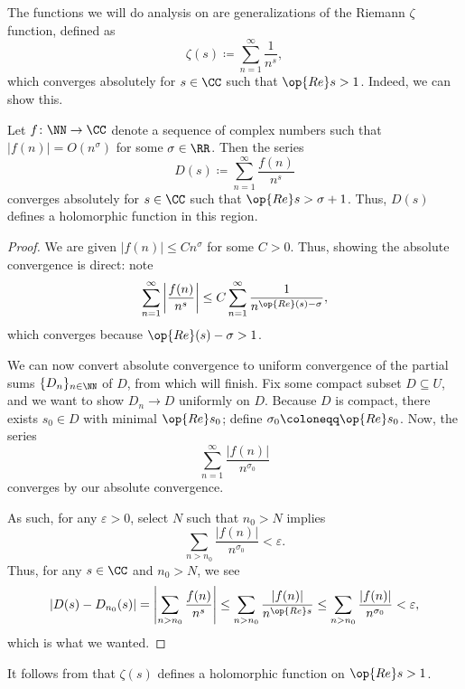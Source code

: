 \documentclass[../notes.tex]{subfiles}
\begin{document}
The functions we will do analysis on are generalizations of the Riemann $\zeta$ function, defined as
\[\zeta(s)\coloneqq\sum_{n=1}^\infty\frac1{n^s},\]
which converges absolutely for $s\in\CC$ such that $\op{Re}s>1$. Indeed, we can show this.
\begin{proposition} \label{prop:basic-dirichlet-series}
	Let $f\colon\NN\to\CC$ denote a sequence of complex numbers such that $|f(n)|=O\left(n^\sigma\right)$ for some $\sigma\in\RR$. Then the series
	\[D(s)\coloneqq\sum_{n=1}^\infty\frac{f(n)}{n^s}\]
	converges absolutely for $s\in\CC$ such that $\op{Re}s>\sigma+1$. Thus, $D(s)$ defines a holomorphic function in this region.
\end{proposition}
\begin{proof}
	We are given $|f(n)|\le Cn^\sigma$ for some $C>0$. Thus, showing the absolute convergence is direct: note
	\[\sum_{n=1}^\infty\left|\frac{f(n)}{n^s}\right|\le C\sum_{n=1}^\infty\frac1{n^{\op{Re}(s)-\sigma}},\]
	which converges because $\op{Re}(s)-\sigma>1$.
	
	We can now convert absolute convergence to uniform convergence of the partial sums $\{D_n\}_{n\in\NN}$ of $D$, from which  will finish. Fix some compact subset $D\subseteq U$, and we want to show $D_n\to D$ uniformly on $D$. Because $D$ is compact, there exists $s_0\in D$ with minimal $\op{Re}s_0$; define $\sigma_0\coloneqq\op{Re}s_0$. Now, the series
	\[\sum_{n=1}^\infty\frac{|f(n)|}{n^{\sigma_0}}\]
	converges by our absolute convergence.
	
	As such, for any $\varepsilon>0$, select $N$ such that $n_0>N$ implies
	\[\sum_{n>n_0}\frac{|f(n)|}{n^{\sigma_0}}<\varepsilon.\]
	Thus, for any $s\in\CC$ and $n_0>N$, we see
	\[\left|D(s)-D_{n_0}(s)\right|=\left|\sum_{n>n_0}\frac{f(n)}{n^s}\right|\le\sum_{n>n_0}\frac{|f(n)|}{n^{\op{Re}s}}\le\sum_{n>n_0}\frac{|f(n)|}{n^{\sigma_0}}<\varepsilon,\]
	which is what we wanted.
\end{proof}
It follows from  that $\zeta(s)$ defines a holomorphic function on $\op{Re}s>1$.
\end{document}
